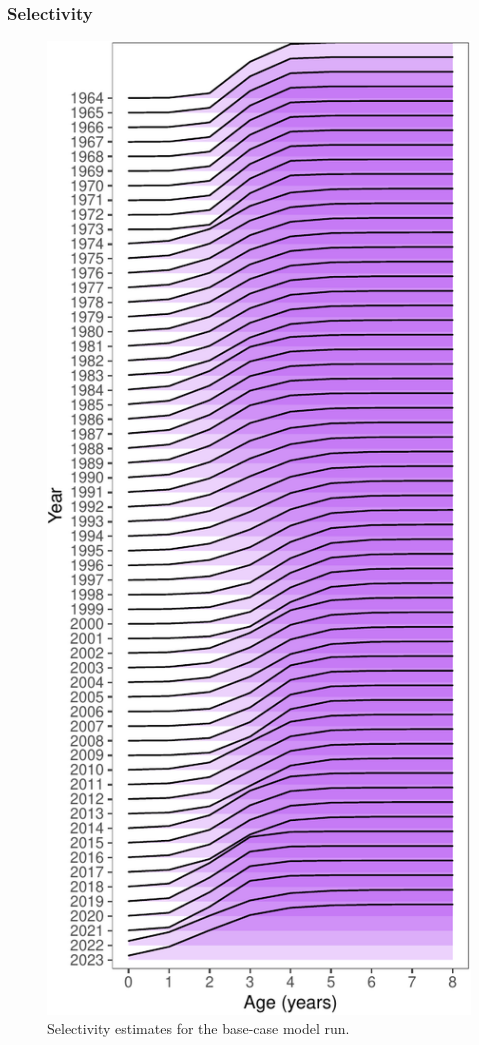 \documentclass[
  letterpaper,
  DIV=11,
  numbers=noendperiod]{scrartcl}
\begin{document}
\subsubsection{Selectivity}\label{selectivity}

\begin{figure}[H]

{\centering \includegraphics{00-Namibian_hake_model_2024_files/figure-pdf/selex-1.pdf}

}

\caption{Selectivity estimates for the base-case model run.}

\end{figure}%
\end{document}
